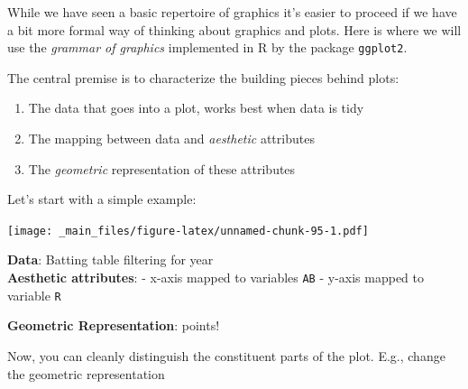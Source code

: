 \documentclass[]{article}
\newenvironment{Shaded}{\begin{snugshade}}{\end{snugshade}}
\newcommand{\KeywordTok}[1]{\textcolor[rgb]{0.13,0.29,0.53}{\textbf{{#1}}}}
\newcommand{\DataTypeTok}[1]{\textcolor[rgb]{0.13,0.29,0.53}{{#1}}}
\newcommand{\StringTok}[1]{\textcolor[rgb]{0.31,0.60,0.02}{{#1}}}
\newcommand{\CommentTok}[1]{\textcolor[rgb]{0.56,0.35,0.01}{\textit{{#1}}}}
\newcommand{\NormalTok}[1]{{#1}}
\theoremstyle{definition}
\theoremstyle{definition}
\theoremstyle{remark}
\begin{document}
While we have seen a basic repertoire of graphics it's easier to proceed
if we have a bit more formal way of thinking about graphics and plots.
Here is where we will use the \emph{grammar of graphics} implemented in
R by the package \texttt{ggplot2}.

The central premise is to characterize the building pieces behind plots:

\begin{enumerate}
\def\labelenumi{\arabic{enumi}.}
\itemsep1pt\parskip0pt
\item
  The data that goes into a plot, works best when data is tidy
\item
  The mapping between data and \emph{aesthetic} attributes
\item
  The \emph{geometric} representation of these attributes
\end{enumerate}

Let's start with a simple example:

\begin{Shaded}
\end{Shaded}

\texttt{[image: \_main\_files/figure-latex/unnamed-chunk-95-1.pdf]}

\textbf{Data}: Batting table filtering for year\\\textbf{Aesthetic
attributes}: - x-axis mapped to variables \texttt{AB} - y-axis mapped to
variable \texttt{R}

\textbf{Geometric Representation}: points!

Now, you can cleanly distinguish the constituent parts of the plot.
E.g., change the geometric representation

\begin{Shaded}
\end{Shaded}
\end{document}
